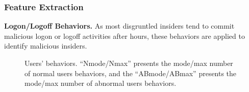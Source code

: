 \documentclass[conference]{IEEEtran}
\begin{document}

\subsubsection{Feature Extraction}


\textbf{Logon/Logoff Behaviors.} 
As most disgruntled insiders tend to
commit malicious logon or logoff activities after hours,  these behaviors are applied to identify malicious insiders.



\begin{figure}[!t]
\centering
{} 
\caption{  Users' behaviors. 
``Nmode/Nmax'' presents the mode/max number of normal users behaviors, and
the ``ABmode/ABmax'' presents the mode/max number of abnormal users
behaviors. }
\label{fig4}
\end{figure}
\end{document}
